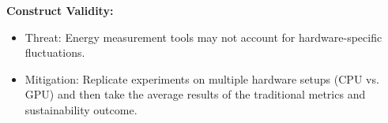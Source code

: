 \documentclass[conference]{IEEEtran}
\begin{document}
\textbf{Construct Validity:}
\begin{itemize}
    \item Threat: Energy measurement tools may not account for hardware-specific fluctuations.
    \item Mitigation: Replicate experiments on multiple hardware setups (CPU vs. GPU) and then take the average results of the traditional metrics and sustainability outcome.
\end{itemize}



\end{document}
